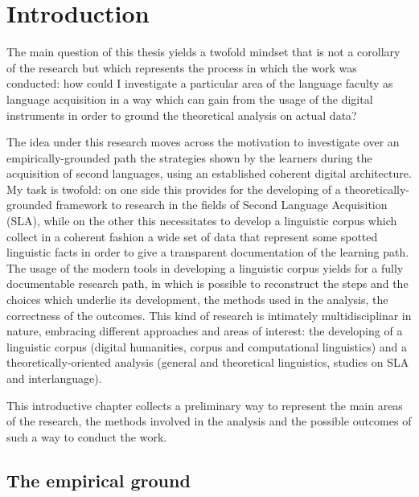 \documentclass[a4paper,twoside,11pt,chapterprefix=false,bibliography=totocnumbered]{scrbook}
\theoremstyle{definition}
\theoremstyle{definition}
\theoremstyle{definition}
\theoremstyle{remark}
\begin{document}
\chapter{Introduction}\label{introduction}

The main question of this thesis yields a twofold mindset that is not a
corollary of the research but which represents the process in which the
work was conducted: how could I investigate a particular area of the
language faculty as language acquisition in a way which can gain from
the usage of the digital instruments in order to ground the theoretical
analysis on actual data?

The idea under this research moves across the motivation to investigate
over an empirically-grounded path the strategies shown by the learners
during the acquisition of second languages, using an established
coherent digital architecture. My task is twofold: on one side this
provides for the developing of a theoretically-grounded framework to
research in the fields of Second Language Acquisition (SLA), while on
the other this necessitates to develop a linguistic corpus which collect
in a coherent fashion a wide set of data that represent some spotted
linguistic facts in order to give a transparent documentation of the
learning path. The usage of the modern tools in developing a linguistic
corpus yields for a fully documentable research path, in which is
possible to reconstruct the steps and the choices which underlie its
development, the methods used in the analysis, the correctness of the
outcomes. This kind of research is intimately multidisciplinar in
nature, embracing different approaches and areas of interest: the
developing of a linguistic corpus (digital humanities, corpus and
computational linguistics) and a theoretically-oriented analysis
(general and theoretical linguistics, studies on SLA and interlanguage).

This introductive chapter collects a preliminary way to represent the
main areas of the research, the methods involved in the analysis and the
possible outcomes of such a way to conduct the work.

\section{The empirical ground}\label{the-empirical-ground}
\end{document}
